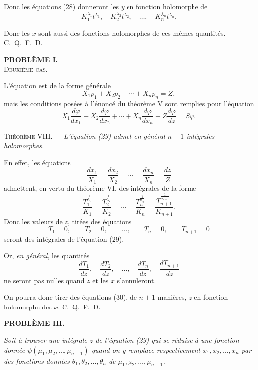 \documentclass[11pt]{article}
\begin{document}
Donc les équations (28) donneront les $y$ en fonction holomorphe de
\[
K_1^{\lambda_1}t^{\lambda_1},\quad K_2^{\lambda_2}t^{\lambda_2},\quad \ldots,\quad K_n^{\lambda_n}t^{\lambda_n}.
\]

Donc les $x$ sont aussi des fonctions holomorphes de ces mêmes quantités. \hfill\mbox{C. Q. F. D.}

\begin{center}
{\bfseries PROBLÈME I.}\\[0.6em]
{\scshape Deuxième cas.}
\end{center}

L’équation est de la forme générale
\begin{equation*}\tag{29}
X_1p_1+X_2p_2+\cdots+X_np_n=Z,
\end{equation*}
mais les conditions posées à l’énoncé du théorème V sont remplies pour l’équation
\[
X_1\frac{d\varphi}{dx_1}+X_2\frac{d\varphi}{dx_2}+\cdots+X_n\frac{d\varphi}{dx_n}+Z\frac{d\varphi}{dz}=S\varphi.
\]

\noindent\textsc{Théorème VIII.} --- \emph{L’équation (29) admet en général $n+1$ intégrales holomorphes.}

En effet, les équations
\[
\frac{dx_1}{X_1}=\frac{dx_2}{X_2}=\cdots=\frac{dx_n}{X_n}=\frac{dz}{Z}
\]
admettent, en vertu du théorème VI, des intégrales de la forme
\[
\frac{T_1^{\frac1{\lambda_1}}}{K_1}
=
\frac{T_2^{\frac1{\lambda_2}}}{K_2}
=\cdots=
\frac{T_n^{\frac1{\lambda_n}}}{K_n}
=
\frac{T_{n+1}^{\frac1{\lambda_{n+1}}}}{K_{n+1}}.
\]
Donc les valeurs de $z$, tirées des équations
\begin{equation*}\tag{30}
T_1=0,
\qquad
T_2=0,
\qquad \ldots,
\qquad
T_n=0,
\qquad
T_{n+1}=0
\end{equation*}
seront des intégrales de l’équation (29).

Or, \emph{en général}, les quantités
\[
\frac{dT_1}{dz},\quad \frac{dT_2}{dz},\quad \ldots,\quad \frac{dT_n}{dz},\quad \frac{dT_{n+1}}{dz}
\]
ne seront pas nulles quand $z$ et les $x$ s’annuleront.

On pourra donc tirer des équations (30), de $n+1$ manières, $z$ en fonction holomorphe des $x$. \hfill\mbox{C. Q. F. D.}

\begin{center}
{\bfseries PROBLÈME III.}
\end{center}

\emph{Soit à trouver une intégrale $z$ de l’équation (29) qui se réduise à une fonction donnée $\psi(\mu_1,\mu_2,\ldots,\mu_{n-1})$ quand on y remplace respectivement $x_1,x_2,\ldots,x_n$ par des fonctions données $\theta_1,\theta_2,\ldots,\theta_n$ de $\mu_1,\mu_2,\ldots,\mu_{n-1}$.}
\end{document}
